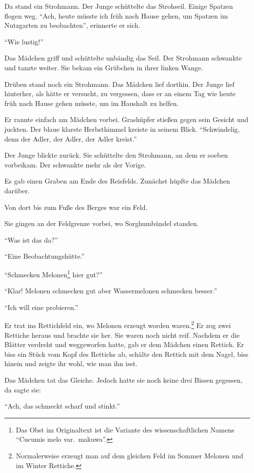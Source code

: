 \documentclass[prd,12pt,tightenlines,notitlepage,nofootinbib]{revtex4-1}
\begin{document}
Da stand ein Strohmann.  Der Junge schüttelte das Strohseil.  Einige
Spatzen flogen weg.  "`Ach, heute müsste ich früh nach Hause gehen, um
Spatzen im Nutzgarten zu beobachten"', erinnerte er sich.

"`Wie lustig!"'

Das Mädchen griff und schüttelte unbändig das Seil.  Der Strohmann schwankte und
tanzte weiter.  Sie bekam ein Grübchen in ihrer linken Wange.

Drüben
stand noch ein Strohmann.  Das Mädchen lief dorthin.  Der Junge lief hinterher,
als hätte er versucht, zu vergessen, dass er an einem Tag wie heute
früh nach Hause gehen müsste, um im Haushalt zu helfen.

Er rannte
einfach am Mädchen vorbei.  Grashüpfer stießen gegen sein
Gesicht und juckten.  Der blaue klarste Herbsthimmel kreiste in seinem Blick.
"`Schwindelig, denn der Adler, der Adler, der Adler kreist."'

Der Junge blickte
zurück.  Sie schüttelte den Strohmann, an dem er soeben vorbeikam.  Der
schwankte mehr als der Vorige.

Es gab einen Graben am Ende des
Reisfelds.  Zunächst hüpfte das Mädchen darüber.

Von dort bis zum Fuße
des Berges war ein Feld.

Sie gingen an der Feldgrenze vorbei, wo
Sorghumbündel standen.

"`Was ist das da?"'

"`Eine Beobachtungshütte."'

"`Schmecken Melonen\footnote{
  Das Obst im Originaltext ist die Variante des wissenschaftlichen Namens
  "`Cucumis melo var.\ makuwa"'.}
hier gut?"'

"`Klar!  Melonen schmecken gut aber Wassermelonen schmecken besser."'

"`Ich will eine probieren."'

Er trat ins Rettichfeld ein, wo Melonen erzeugt worden waren.\footnote{
Normalerweise erzeugt man auf dem gleichen Feld
im Sommer Melonen und im Winter Rettiche.}
Er zog
zwei Rettiche heraus und brachte sie her.  Sie waren noch nicht reif.
Nachdem er die Blätter verdreht und weggeworfen hatte, gab er dem Mädchen einen
Rettich.  Er biss ein Stück vom Kopf des Rettichs ab, schälte den
Rettich mit dem Nagel, biss hinein und zeigte ihr wohl, wie man ihn
isst.

Das Mädchen tat das Gleiche.  Jedoch hatte sie noch keine drei
Bissen gegessen, da sagte sie:

"`Ach, das schmeckt scharf und stinkt."'
\end{document}
